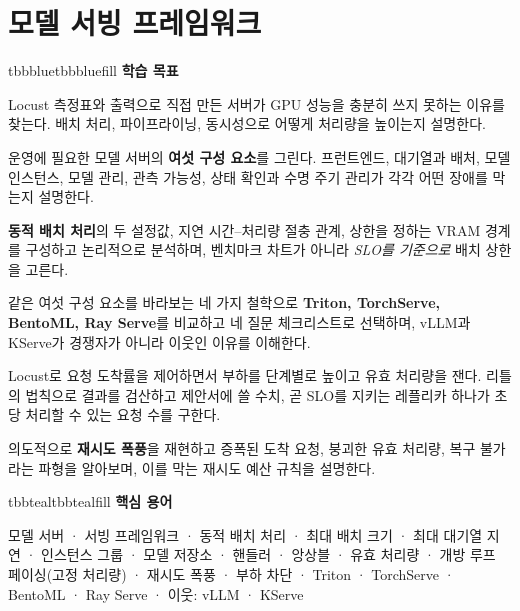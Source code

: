 \setcounter{chapter}{8}
\chapter{모델 서빙 프레임워크}

\begin{calloutbox}{tbbblue}{tbbbluefill}
{\normalsize\bfseries\color{tbbblue}학습 목표}\par\vspace{3pt}
\begin{tbbitemize}
  \item Locust 측정표와  출력으로 직접 만든 서버가 GPU 성능을 충분히 쓰지 못하는 이유를 찾는다. 배치 처리, 파이프라이닝, 동시성으로 어떻게 처리량을 높이는지 설명한다.
  \item 운영에 필요한 모델 서버의 \textbf{여섯 구성 요소}를 그린다. 프런트엔드, 대기열과 배처, 모델 인스턴스, 모델 관리, 관측 가능성, 상태 확인과 수명 주기 관리가 각각 어떤 장애를 막는지 설명한다.
  \item \textbf{동적 배치 처리}의 두 설정값, 지연 시간–처리량 절충 관계, 상한을 정하는 VRAM 경계를 구성하고 논리적으로 분석하며, 벤치마크 차트가 아니라 \textit{SLO를 기준으로} 배치 상한을 고른다.
  \item 같은 여섯 구성 요소를 바라보는 네 가지 철학으로 \textbf{Triton, TorchServe, BentoML, Ray Serve}를 비교하고 네 질문 체크리스트로 선택하며, vLLM과 KServe가 경쟁자가 아니라 이웃인 이유를 이해한다.
  \item Locust로 요청 도착률을 제어하면서 부하를 단계별로 높이고 유효 처리량을 잰다. 리틀의 법칙으로 결과를 검산하고 제안서에 쓸 수치, 곧 SLO를 지키는 레플리카 하나가 초당 처리할 수 있는 요청 수를 구한다.
  \item 의도적으로 \textbf{재시도 폭풍}을 재현하고 증폭된 도착 요청, 붕괴한 유효 처리량, 복구 불가라는 파형을 알아보며, 이를 막는 재시도 예산 규칙을 설명한다.
\end{tbbitemize}
\end{calloutbox}

\vspace{3.5pt}

\begin{calloutbox}{tbbteal}{tbbtealfill}
{\normalsize\bfseries\color{tbbteal}핵심 용어}\par\vspace{3pt}
모델 서버 · 서빙 프레임워크 · 동적 배치 처리 · 최대 배치 크기 · 최대 대기열 지연 · 인스턴스 그룹 · 모델 저장소 · 핸들러 · 앙상블 · 유효 처리량 · 개방 루프 페이싱(고정 처리량) · 재시도 폭풍 · 부하 차단 · Triton · TorchServe · BentoML · Ray Serve · 이웃: vLLM · KServe
\end{calloutbox}

